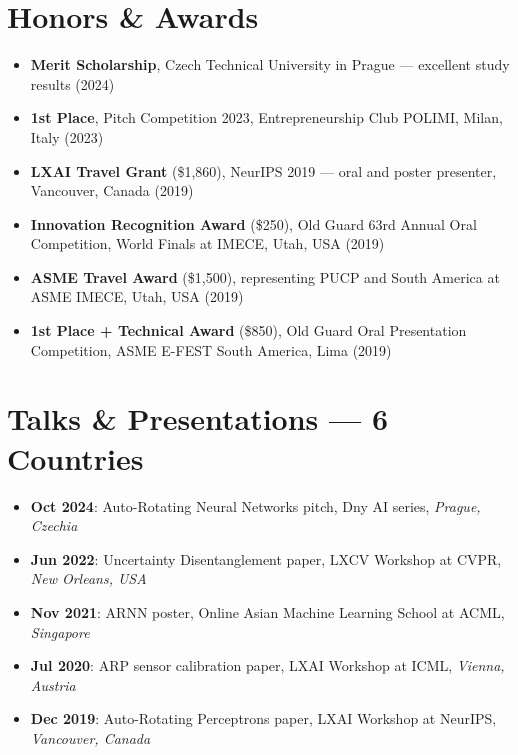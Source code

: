 \documentclass[11pt,letterpaper]{article}
\begin{document}
\section{Honors \& Awards}

\begin{itemize}
  \item \textbf{Merit Scholarship}, Czech Technical University in Prague --- excellent study results (2024)
  \item \textbf{1st Place}, Pitch Competition 2023, Entrepreneurship Club POLIMI, Milan, Italy (2023)
  \item \textbf{LXAI Travel Grant} (\$1,860), NeurIPS 2019 --- oral and poster presenter, Vancouver, Canada (2019)
  \item \textbf{Innovation Recognition Award} (\$250), Old Guard 63rd Annual Oral Competition, World Finals at IMECE, Utah, USA (2019)
  \item \textbf{ASME Travel Award} (\$1,500), representing PUCP and South America at ASME IMECE, Utah, USA (2019)
  \item \textbf{1st Place + Technical Award} (\$850), Old Guard Oral Presentation Competition, ASME E-FEST South America, Lima (2019)
\end{itemize}
\vspace{0.3em}

\section{Talks \& Presentations --- 6 Countries}

\begin{itemize}
  \item \textbf{Oct 2024}: Auto-Rotating Neural Networks pitch, Dny AI series, \textit{Prague, Czechia}
  \item \textbf{Jun 2022}: Uncertainty Disentanglement paper, LXCV Workshop at CVPR, \textit{New Orleans, USA}
  \item \textbf{Nov 2021}: ARNN poster, Online Asian Machine Learning School at ACML, \textit{Singapore}
  \item \textbf{Jul 2020}: ARP sensor calibration paper, LXAI Workshop at ICML, \textit{Vienna, Austria}
  \item \textbf{Dec 2019}: Auto-Rotating Perceptrons paper, LXAI Workshop at NeurIPS, \textit{Vancouver, Canada}
\end{itemize}
\vspace{0.3em}
\end{document}
